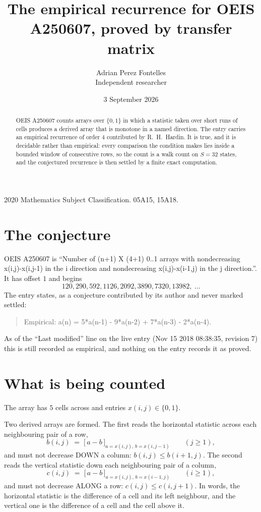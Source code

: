 \documentclass[11pt,a4paper]{article}
\title{The empirical recurrence for OEIS A250607, proved by transfer matrix}
\author{Adrian Perez Fontelles\\ \small Independent researcher}
\date{3 September 2026}
\theoremstyle{plain}
\theoremstyle{definition}
\begin{document}
\maketitle

\begin{abstract}
OEIS A250607 counts arrays over $\{0,1\}$ in which a statistic taken over short runs
of cells produces a derived array that is monotone in a named direction. The entry carries an
empirical recurrence of order $4$ contributed by R.~H.~Hardin. It is true, and it is
decidable rather than empirical: every comparison the condition makes lies inside a bounded
window of consecutive rows, so the count is a walk count on $S=32$ states, and the
conjectured recurrence is then settled by a finite exact computation.
\end{abstract}

\noindent\small 2020 Mathematics Subject Classification. 05A15, 15A18.\normalsize

\section{The conjecture}

OEIS A250607 is ``Number of (n+1) X (4+1) 0..1 arrays with nondecreasing x(i,j)-x(i,j-1) in the i direction and nondecreasing x(i,j)-x(i-1,j) in the j direction.''. It has offset $1$ and begins
\[
120, 290, 592, 1126, 2092, 3890, 7320, 13982,\ \dots
\]
The entry states, as a conjecture contributed by its author and never marked settled:
\begin{quote}
Empirical: a(n) = 5*a(n-1) - 9*a(n-2) + 7*a(n-3) - 2*a(n-4).
\end{quote}
As of the ``Last modified'' line on the live entry (Nov 15 2018 08:38:35, revision 7) this is still
recorded as empirical, and nothing on the entry records it as proved.

\section{What is being counted}

The array has $5$ cells across and entries $x(i,j)\in\{0,1\}$.

Two derived arrays are formed. The first reads the horizontal statistic across each
neighbouring pair of a row,
\[
b(i,j)\;=\;\bigl[\,a-b\,\bigr]_{a=x(i,j),\,b=x(i,j-1)}\qquad (j\ge1),
\]
and must not decrease DOWN a column: $b(i,j)\le b(i{+}1,j)$. The second reads the vertical
statistic down each neighbouring pair of a column,
\[
c(i,j)\;=\;\bigl[\,a-b\,\bigr]_{a=x(i,j),\,b=x(i{-}1,j)}\qquad (i\ge1),
\]
and must not decrease ALONG a row: $c(i,j)\le c(i,j{+}1)$. In words, the horizontal statistic
is the difference of a cell and its left neighbour, and the vertical one is
the difference of a cell and the cell above it.
\end{document}
